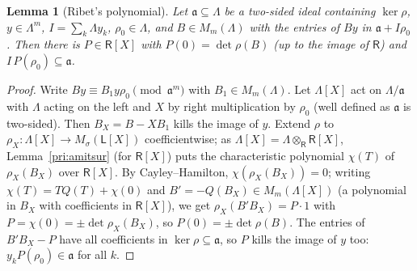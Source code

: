 \documentclass[10pt]{amsart}
\newtheorem{lemma}[theorem]{Lemma}
\theoremstyle{definition}
\theoremstyle{remark}
\begin{document}
\begin{lemma}[Ribet's polynomial]\label{pri:ribet-poly}
Let $\mathfrak a\subseteq\Lambda$ be a two-sided ideal containing $\ker\rho$, $y\in\Lambda^m$,
$I=\sum_k\Lambda y_k$, $\rho_0\in\Lambda$, and $B\in M_m(\Lambda)$ with the entries of $By$ in
$\mathfrak a+I\rho_0$. Then there is $P\in\mathsf R[X]$ with $P(0)=\det\rho(B)$ (up to the image of
$\mathsf R$) and $I\,P(\rho_0)\subseteq\mathfrak a$.
\end{lemma}
\begin{proof}
Write $By\equiv B_1y\rho_0\pmod{\mathfrak a^m}$ with $B_1\in M_m(\Lambda)$. Let $\Lambda[X]$ act on
$\Lambda/\mathfrak a$ with $\Lambda$ acting on the left and $X$ by right multiplication by
$\rho_0$ (well defined as $\mathfrak a$ is two-sided). Then $B_X=B-XB_1$ kills the image of $y$.
Extend $\rho$ to $\rho_X\colon\Lambda[X]\to M_\sigma(\mathsf L[X])$ coefficientwise; as
$\Lambda[X]=\Lambda\otimes_{\mathsf R}\mathsf R[X]$, Lemma~\ref{pri:amitsur} (for $\mathsf R[X]$)
puts the characteristic polynomial $\chi(T)$ of $\rho_X(B_X)$ over $\mathsf R[X]$. By
Cayley--Hamilton, $\chi(\rho_X(B_X))=0$; writing $\chi(T)=TQ(T)+\chi(0)$ and $B'=-Q(B_X)\in
M_m(\Lambda[X])$ (a polynomial in $B_X$ with coefficients in $\mathsf R[X]$), we get $\rho_X(B'B_X)=
P\cdot1$ with $P=\chi(0)=\pm\det\rho_X(B_X)$, so $P(0)=\pm\det\rho(B)$. The entries of $B'B_X-P$
have all coefficients in $\ker\rho\subseteq\mathfrak a$, so $P$ kills the image of $y$ too:
$y_kP(\rho_0)\in\mathfrak a$ for all $k$.
\end{proof}
\end{document}
